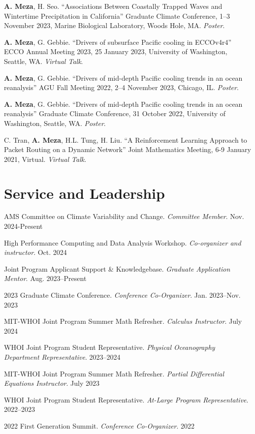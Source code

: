 \documentclass[letterpaper,11pt]{article}
\begin{document}
\textbf{A. Meza}, H. Seo. ``Associations Between Coastally Trapped Waves and Wintertime Precipitation in California'' Graduate Climate Conference, 1–3 November 2023, Marine Biological Laboratory, Woods Hole, MA. \textit{Poster}. 

\textbf{A. Meza}, G. Gebbie. ``Drivers of subsurface Pacific cooling in ECCOv4r4'' ECCO Annual Meeting 2023, 25 January 2023, University of Washington, Seattle, WA. \textit{Virtual Talk}. 

\textbf{A. Meza}, G. Gebbie. ``Drivers of mid-depth Pacific cooling trends in an ocean reanalysis'' AGU Fall Meeting 2022, 2–4 November 2023, Chicago, IL. \textit{Poster}. 

\textbf{A. Meza}, G. Gebbie. ``Drivers of mid-depth Pacific cooling trends in an ocean reanalysis'' Graduate Climate Conference, 31 October 2022, University of Washington, Seattle, WA. \textit{Poster}. 

{C. Tran}, \textbf{A. Meza}, H.L. Tung, H. Liu. ``A Reinforcement Learning Approach to Packet Routing on a Dynamic Network'' Joint Mathematics Meeting, 6-9 January 2021, Virtual. \textit{Virtual Talk}. 


\section{Service and Leadership}
AMS Committee on Climate Variability and Change. \textit{Committee Member}. Nov. 2024-Present

High Performance Computing and Data Analysis Workshop. \textit{Co-organizer and instructor}. {Oct. 2024}

Joint Program Applicant Support \& Knowledgebase. \textit{Graduate Application Mentor}. {Aug. 2023--Present}

2023 Graduate Climate Conference. \textit{Conference Co-Organizer}. {Jan. 2023--Nov. 2023}

MIT-WHOI Joint Program Summer Math Refresher. \textit{Calculus Instructor}. {July 2024}

WHOI Joint Program Student Representative. \textit{Physical Oceanography Department Representative}. {2023--2024}

MIT-WHOI Joint Program Summer Math Refresher. \textit{Partial Differential Equations Instructor}. {July 2023}

WHOI Joint Program Student Representative. \textit{At-Large Program Representative}. {2022--2023}

2022 First Generation Summit. \textit{Conference Co-Organizer}. {2022}
\end{document}
